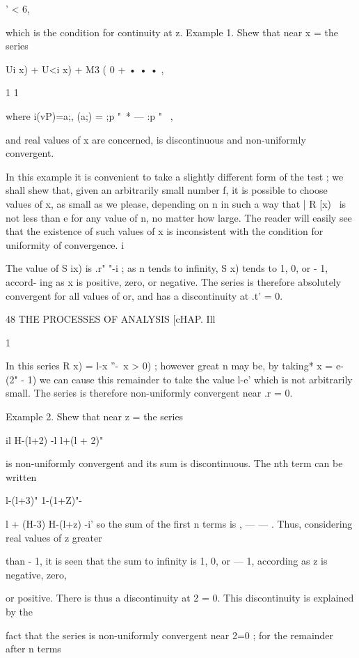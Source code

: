 ' < 6, 

which is the condition for continuity at z. 
Example 1. Shew that near x = the series 

Ui  x) + U<i  x) + M3 ( 0 + • • • , 

1 1 

where  i(vP)=a;,   (a;) = ;p "~* — :p "~ , 

and real values of x are concerned, is discontinuous and non-uniformly convergent. 

In this example it is convenient to take a slightly different form of the test ; we shall 
shew that, given an arbitrarily small number f, it is possible to choose values of x, as 
small as we please, depending on n in such a way that | R  [x) \ is not less than e for any 
value of n, no matter how large. The reader will easily see that the existence of such 
values of x is inconsistent with the condition for uniformity of convergence. 
i\    

The value of S ix) is .r" "-i ; as n tends to infinity, S   x) tends to 1, 0, or - 1, accord- 
ing as x is positive, zero, or negative. The series is therefore absolutely convergent for all 
values of or, and has a discontinuity at .t' = 0. 



48 THE PROCESSES OF ANALYSIS [cHAP. Ill 

1 

In this series R   x) = l-x ''-\  x > 0) ; however great n may be, by taking* x = e- (2" - 1) 
we can cause this remainder to take the value l-e'  which is not arbitrarily small. The 
series is therefore non-uniformly convergent near .r = 0. 

Example 2. Shew that near z = the series 

 il  H-(l+2) -l  l+(l + 2)"  

is non-uniformly convergent and its sum is discontinuous. 
The nth term can be written 

l-(l+3)" 1-(1+Z)"-  

l + (H-3)  H-(l+z) -i' 
so the sum of the first n terms is  , — — . Thus, considering real values of z greater 

than - 1, it is seen that the sum to infinity is 1, 0, or — 1, according as z is negative, zero, 

or positive. There is thus a discontinuity at 2 = 0. This discontinuity is explained by the 

fact that the series is non-uniformly convergent near 2=0 ; for the remainder after n terms 

